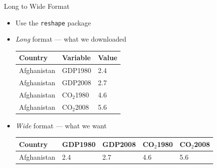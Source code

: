 \documentclass{beamer}
\begin{document}
\begin{frame}{Long to Wide Format}
\begin{itemize}
	\item Use the {\tt reshape} package
	\item \emph{Long} format --- what we downloaded \\
		\begin{table}
			\begin{tabular}{ | l | l | l | } \hline
			Country		& Variable		& Value \\ \hline
			Afghanistan	& GDP1980		& 2.4   \\ \hline
			Afghanistan	& GDP2008  		& 2.7   \\ \hline
			Afghanistan	& CO$_2$1980  	& 4.6   \\ \hline
			Afghanistan	& CO$_2$2008  	& 5.6   \\ \hline
			\end{tabular}
		\end{table}
		
	\item \emph{Wide} format --- what we want \\
		\begin{table}
			\begin{tabular}{| l || l | l | l | l |} \hline
			Country		& GDP1980	& GDP2008	& CO$_2$1980	& CO$_2$2008 \\ \hline
			Afghanistan	& 2.4			& 2.7			& 4.6				& 5.6 \\ \hline
			\end{tabular}
		\end{table}
\end{itemize}
\end{frame}
\end{document}
